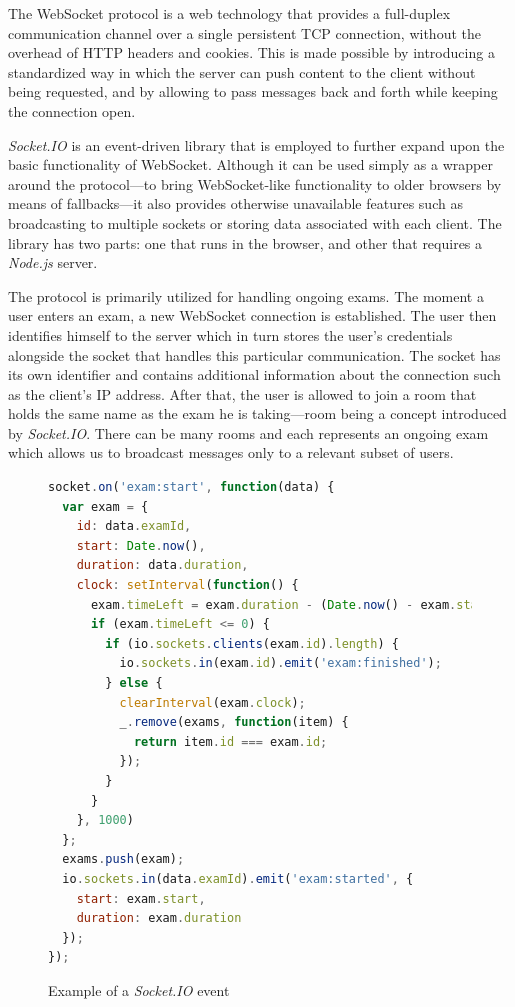 \documentclass[thesis=M,english,hidelinks]{FITthesis}[2012/10/20]
\begin{document}
The WebSocket protocol \cite{websocket} is a web technology that provides a full-duplex communication channel over a single persistent TCP connection, without the overhead of HTTP headers and cookies. This is made possible by introducing a standardized way in which the server can push content to the client without being requested, and by allowing to pass messages back and forth while keeping the connection open.

\textit{Socket.IO} \cite{socketio} is an event-driven library that is employed to further expand upon the basic functionality of WebSocket. Although it can be used simply as a wrapper around the protocol---to bring WebSocket-like functionality to older browsers by means of fallbacks---it also provides otherwise unavailable features such as broadcasting to multiple sockets or storing data associated with each client. The library has two parts: one that runs in the browser, and other that requires a \textit{Node.js} server.

The protocol is primarily utilized for handling ongoing exams. The moment a user enters an exam, a new WebSocket connection is established. The user then identifies himself to the server which in turn stores the user's credentials alongside the socket that handles this particular communication. The socket has its own identifier and contains additional information about the connection such as the client's IP address. After that, the user is allowed to join a room that holds the same name as the exam he is taking---room being a concept introduced by \textit{Socket.IO}. There can be many rooms and each represents an ongoing exam which allows us to broadcast messages only to a relevant subset of users.

\begin{figure}[h]
  \begin{lstlisting}[language=JavaScript]
socket.on('exam:start', function(data) {
  var exam = {
    id: data.examId,
    start: Date.now(),
    duration: data.duration,
    clock: setInterval(function() {
      exam.timeLeft = exam.duration - (Date.now() - exam.start);
      if (exam.timeLeft <= 0) {
        if (io.sockets.clients(exam.id).length) {
          io.sockets.in(exam.id).emit('exam:finished');
        } else {
          clearInterval(exam.clock);
          _.remove(exams, function(item) {
            return item.id === exam.id;
          });
        }
      }
    }, 1000)
  };
  exams.push(exam);
  io.sockets.in(data.examId).emit('exam:started', {
    start: exam.start,
    duration: exam.duration
  });
});
  \end{lstlisting}
  \caption{Example of a \textit{Socket.IO} event}
  \label{fig:socketio_event}
\end{figure}
\end{document}
